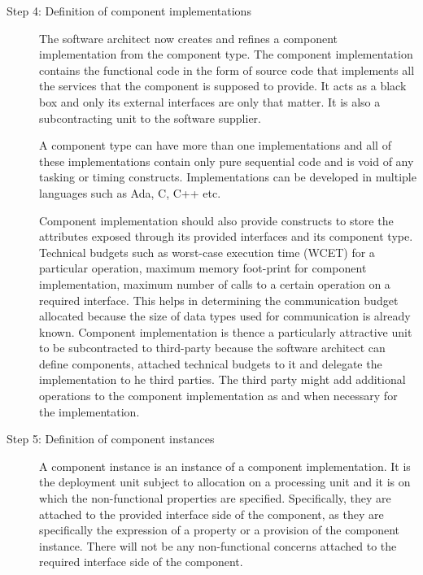 \begin{description}
\item [Step 4: Definition of component implementations] The software architect now creates and refines a component implementation from the component type. The component implementation contains the functional code in the form of source code that implements all the services that the component is supposed to provide. It acts as a  black box and only its external interfaces are only that matter. It is also a subcontracting unit to the software supplier. 

A component type can have more than one implementations and all of these implementations contain only pure sequential code and is void of any tasking or timing constructs. Implementations can be developed in multiple languages such as Ada, C, C++ etc.  

Component implementation should also provide constructs to store the attributes exposed through its provided interfaces and its component type. Technical budgets such as worst-case execution time (WCET) for a particular operation, maximum memory foot-print for component implementation, maximum number of calls to a certain operation on a required interface. This helps in determining the communication budget allocated because the size of data types used for communication is already known. Component implementation is thence a particularly attractive unit to be subcontracted to third-party because the software architect can define components, attached technical budgets to it and delegate the implementation to he third parties. The third party might add additional operations to the component implementation as and when necessary for the implementation.  

\item [Step 5: Definition of component instances] A component instance is an instance of a component implementation. It is the deployment unit subject to allocation on a processing unit and it is on which the non-functional properties are specified. Specifically, they are attached to the provided interface side of the component, as they are specifically the expression of a property or a provision of the component instance. There will not be any non-functional concerns attached to the required interface side of the component. 


\end{description}
